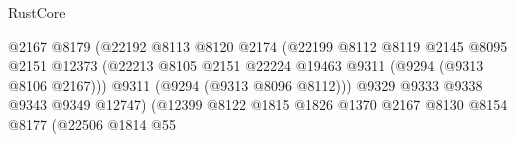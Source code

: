 \begin{lexlean}{RustCore}
\begin{coremodule}
                                                        @2167
                                                        @8179
                                                        (@22192
                                                          @8113
                                                          @8120
                                                          @2174
                                                          (@22199
                                                            @8112
                                                            @8119
                                                            @2145
                                                            @8095
                                                            @2151
                                                            @12373
                                                            (@22213
                                                              @8105
                                                              @2151
                                                              @22224
                                                              @19463
                                                              @9311
                                                              (@9294 (@9313 @8106 @2167)))
                                                            @9311
                                                            (@9294 (@9313 @8096 @8112)))
                                                          @9329
                                                          @9333
                                                          @9338
                                                          @9343
                                                          @9349
                                                          @12747)
                                                        (@12399
                                                          @8122
                                                          @1815
                                                          @1826
                                                          @1370
                                                          @2167
                                                          @8130
                                                          @8154
                                                          @8177
                                                          (@22506
                                                            @1814
                                                            @55

\end{coremodule}
\end{lexlean}
